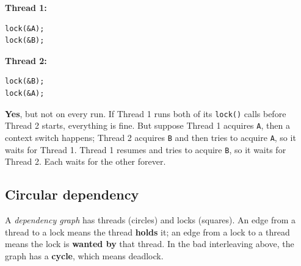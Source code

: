 \documentclass[11pt,a4paper]{article}
\begin{document}
\begin{center}
\begin{minipage}[t]{0.4\textwidth}
\textbf{Thread 1:}
\begin{lstlisting}[numbers=none]
lock(&A);
lock(&B);
\end{lstlisting}
\end{minipage}\hspace{2em}
\begin{minipage}[t]{0.4\textwidth}
\textbf{Thread 2:}
\begin{lstlisting}[numbers=none]
lock(&B);
lock(&A);
\end{lstlisting}
\end{minipage}
\end{center}

\begin{quizbox}
\textbf{Yes}, but not on every run. If Thread 1 runs both of its
\texttt{lock()} calls before Thread 2 starts, everything is fine. But
suppose Thread 1 acquires \texttt{A}, then a context switch happens; Thread 2
acquires \texttt{B} and then tries to acquire \texttt{A}, so it waits for
Thread 1. Thread 1 resumes and tries to acquire \texttt{B}, so it waits for
Thread 2. Each waits for the other forever.
\end{quizbox}

\subsection{Circular dependency}

A \emph{dependency graph} has threads (circles) and locks (squares). An edge
from a thread to a lock means the thread \textbf{holds} it; an edge from a
lock to a thread means the lock is \textbf{wanted by} that thread. In the bad
interleaving above, the graph has a \textbf{cycle}, which means deadlock.

\begin{center}
\end{center}
\end{document}
